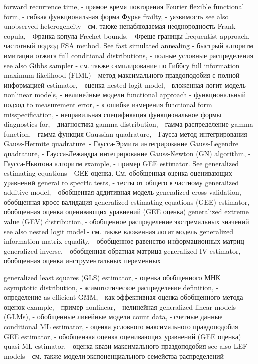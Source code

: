 forward recurrence time, - прямое время повторения
Fourier flexible functional form, - гибкая функциональная форма Фурье
frailty, - уязвимость
see also unobserved heterogeneity - см. также ненаблюдаемая неоднородность
Frank copula, - Франка копула
Frechet bounds, - Фреше границы
frequentist approach, - частотный подход
FSA method. See fast simulated annealing - быстрый алгоритм имитации отжига
full conditional distributions, - полные условные распределения
see also Gibbs sampler - см. также сэмплирование по Гиббсу
full information maximum likelihood (FIML) - метод максимального правдоподобия с полной информацией
estimator, - оценка
nested logit model, - вложенная логит модель
nonlinear models, - нелинейные модели 
functional approach - функциональный подход
to measurement error, - к ошибке измерения
functional form misspecification, - неправильная спецификация функциональное формы
diagnostics for, - диагностика
gamma distribution, - гамма-распределение
gamma function, - гамма-функция
Gaussian quadrature, - Гаусса метод интегрирования 
Gauss-Hermite quadrature, - Гаусса-Эрмита интегрирование
Gauss-Legendre quadrature, - Гаусса-Лежандра интегрирование
Gauss-Newton (GN) algorithm, - Гаусса-Ньютона алгоритм
example, - пример
GEE estimator. See generalized estimating equations - GEE оценка. См. обобщенная оценка оценивающих уравнений
general to specific tests, - тесты от общего к частному
generalized additive model, - обобщенная аддитивная модель
generalized cross-validation, - обобщенная кросс-валидация
generalized estimating equations (GEE) estimator, обобщенная оценка оценивающих уравнений (GEE оценка)
generalized extreme value (GEV) distribution, - обобщенное распределение экстремальных значений
see also nested logit model - см. также вложенная логит модель
generalized information matrix equality, - обобщенное равенство информационных матриц
generalized inverse, - обобщенная обратная матрица
generalized IV estimator, - обобщенная оценка инструментальных переменных

generalized least squares (GLS) estimator, - оценка обобщенного МНК
asymptotic distribution, - асимптотическое распределение
definition, - определение
as efficient GMM, - как эффективная оценка обобщенного метода оценок
example, - пример
nonlinear, - нелинейная
generalized linear models (GLMs), - обобщенные линейные модели
count data, - счетные данные
conditional ML estimator, - оценка условного максимального правдоподобия
GEE estimator, - обобщенная оценка оценивающих уравнений (GEE оценка)
quasi-ML estimator, - оценка квази-максимального правдоподобия
see also LEF models - см. также модели экспоненциального семейства распределений

